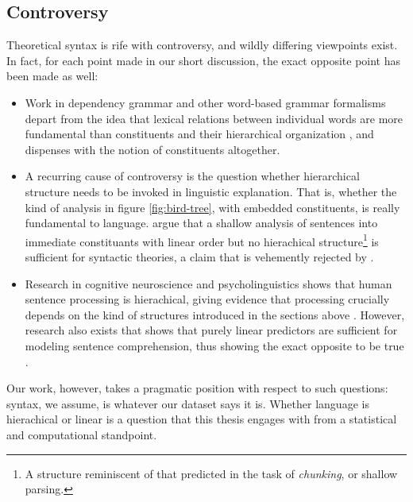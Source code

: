 \subsection{Controversy}
Theoretical syntax is rife with controversy, and wildly differing viewpoints exist. In fact, for each point made in our short discussion, the exact opposite point has been made as well:

\begin{itemize}
  \item Work in dependency grammar and other word-based grammar formalisms depart from the idea that lexical relations between individual words are more fundamental than constituents and their hierarchical organization \citep{tesniere1959elements,nivre2005dependency,hudson2010introduction}, and dispenses with the notion of constituents altogether.

  \item A recurring cause of controversy is the question whether hierarchical structure needs to be invoked in linguistic explanation. That is, whether the kind of analysis in figure \ref{fig:bird-tree}, with embedded constituents, is really fundamental to language. \citet{frank2012hierarchical} argue that a shallow analysis of sentences into immediate constituants with linear order but no hierachical structure\footnote{A structure reminiscent of that predicted in the task of \textit{chunking}, or shallow parsing.} is sufficient for syntactic theories, a claim that is vehemently rejected by \citet{everaert2015structures}.

  \item Research in cognitive neuroscience and psycholinguistics shows that human sentence processing is hierachical, giving evidence that processing crucially depends on the kind of structures introduced in the sections above \citep{hale2001earley,levy2008expectation,brennan2016abstract}. However, research also exists that shows that purely linear predictors are sufficient for modeling sentence comprehension, thus showing the exact opposite to be true \citep{conway2008neurocognitive,gillespie2011hierarchy,christiansen2012similar,gillespie2013against,frank2012hierarchical}.
\end{itemize}
Our work, however, takes a pragmatic position with respect to such questions: syntax, we assume, is whatever our dataset says it is. Whether language is hierachical or linear is a question that this thesis engages with from a statistical and computational standpoint.

